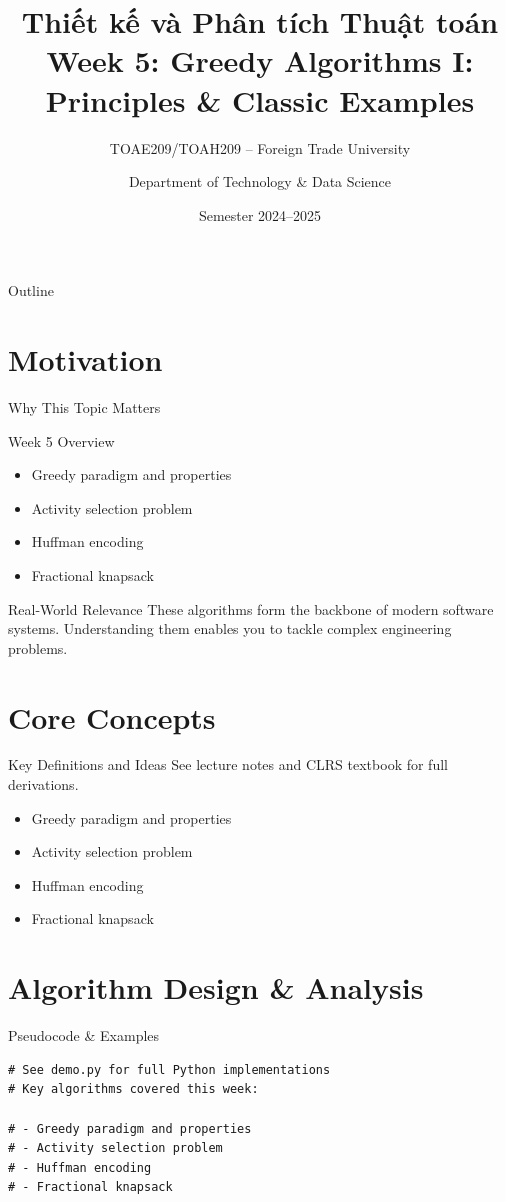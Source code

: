 \documentclass[aspectratio=169,xcolor=dvipsnames]{beamer}
\title[Algorithms -- Week 5]{\textbf{Thiết kế và Phân tích Thuật toán}\\
  \large Week 5: Greedy Algorithms I: Principles & Classic Examples}
\subtitle{TOAE209/TOAH209 -- Foreign Trade University}
\author{Department of Technology \& Data Science}
\date{Semester 2024--2025}
\begin{document}
\begin{frame}\titlepage\end{frame}
\begin{frame}{Outline}\tableofcontents\end{frame}

\section{Motivation}
\begin{frame}{Why This Topic Matters}
  \begin{block}{Week 5 Overview}
    \begin{itemize}
    \item Greedy paradigm and properties
    \item Activity selection problem
    \item Huffman encoding
    \item Fractional knapsack
    \end{itemize}
  \end{block}
  \begin{exampleblock}{Real-World Relevance}
    These algorithms form the backbone of modern software systems.
    Understanding them enables you to tackle complex engineering problems.
  \end{exampleblock}
\end{frame}

\section{Core Concepts}
\begin{frame}{Key Definitions and Ideas}
  See lecture notes and CLRS textbook for full derivations.
  \begin{itemize}
    \item Greedy paradigm and properties
    \item Activity selection problem
    \item Huffman encoding
    \item Fractional knapsack
  \end{itemize}
\end{frame}

\section{Algorithm Design \& Analysis}
\begin{frame}[fragile]{Pseudocode \& Examples}
  \begin{lstlisting}
# See demo.py for full Python implementations
# Key algorithms covered this week:

# - Greedy paradigm and properties
# - Activity selection problem
# - Huffman encoding
# - Fractional knapsack
  \end{lstlisting}
\end{frame}
\end{document}

